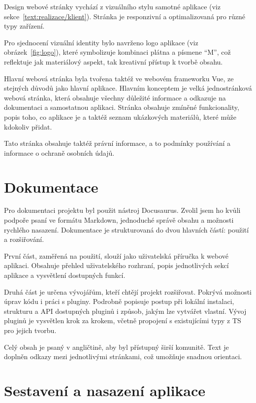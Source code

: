 Design webové stránky vychází z vizuálního stylu samotné aplikace (viz sekce~\ref{text:realizace/klient}). 
Stránka je responzivní a optimalizovaná pro různé typy zařízení.

Pro sjednocení vizuální identity bylo navrženo logo aplikace (viz obrázek~\ref{fig:logo}), které symbolizuje kombinaci plátna a písmene \enquote{M}, což reflektuje jak materiálový aspekt, tak kreativní přístup k tvorbě obsahu.

Hlavní webová stránka byla tvořena taktéž ve webovém frameworku Vue, ze stejných důvodů jako hlavní aplikace.
Hlavním konceptem je velká jednostránková webová stránka, která obsahuje všechny důležité informace a odkazuje na dokumentaci a samostatnou aplikaci.
Stránka obsahuje zmíněné funkcionality, popis toho, co aplikace je a taktéž seznam ukázkových materiálů, které může kdokoliv přidat.

Tato stránka obsahuje taktéž právní informace, a to podmínky používání a informace o ochraně osobních údajů.


\section{Dokumentace}

Pro dokumentaci projektu byl použit nástroj Docusaurus. 
Zvolil jsem ho kvůli podpoře psaní ve formátu Markdown, jednoduché správě obsahu a možnosti rychlého nasazení. 
Dokumentace je strukturovaná do dvou hlavních částí: použití a rozšiřování.

První část, zaměřená na použití, slouží jako uživatelská příručka k webové aplikaci. 
Obsahuje přehled uživatelského rozhraní, popis jednotlivých sekcí aplikace a vysvětlení dostupných funkcí. 

Druhá část je určena vývojářům, kteří chtějí projekt rozšiřovat. 
Pokrývá možnosti úprav kódu i práci s pluginy. 
Podrobně popisuje postup při lokální instalaci, strukturu a API dostupných pluginů i způsob, jakým lze vytvářet vlastní. 
Vývoj pluginů je vysvětlen krok za krokem, včetně propojení s existujícími typy z TS pro jejich tvorbu.

Celý obsah je psaný v angličtině, aby byl přístupný širší komunitě. 
Text je doplněn odkazy mezi jednotlivými stránkami, což umožňuje snadnou orientaci.

\section{Sestavení a nasazení aplikace}\label{text:realizace/nasazeni}

